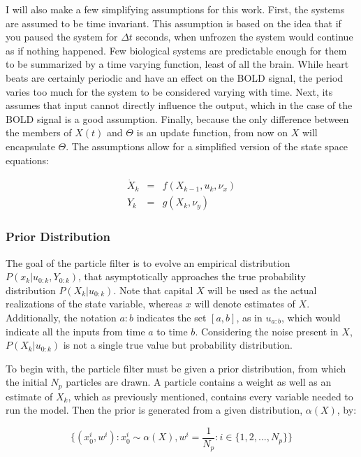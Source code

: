 \documentclass[journal]{./IEEEtran}
\begin{document}
I will also make a few  simplifying assumptions for this work. 
First, the systems are assumed to be 
time invariant. This 
assumption is based on the idea that if you paused the system for $\Delta t$
seconds, when unfrozen the system would continue as if nothing happened. 
Few biological systems are predictable enough for them to be summarized
by a time varying function, least of all the brain. While heart beats are certainly
periodic and have an effect on the BOLD signal, the period varies too much
for the system to be considered varying with time. 
Next, its assumes that input cannot directly
influence the output, which in the case of the BOLD signal is a good assumption.
Finally, because the only difference between the members of $X(t)$ and 
$\Theta$ is an update function, from now on $X$ will encapsulate
$\Theta$. The assumptions allow for a simplified version of the
state space equations:

\begin{eqnarray}
\dot{X}_k &=& f(X_{k-1}, u_k, \nu_x)
\label{eq:stateass}\\
Y_k &= &g(X_k, \nu_y)
\label{eq:measass}
\end{eqnarray}

\subsubsection{Prior Distribution}
The goal of the particle filter is to evolve an empirical distribution 
$P(x_k | u_{0:k}, Y_{0:k})$,
that asymptotically approaches the true probability distribution $P(X_k | u_{0:k})$.
Note that capital $X$ will be used as the actual realizations of 
the state variable, whereas $x$ will denote estimates of $X$.
Additionally, the notation $a:b$ indicates the set $[a,b]$,
as in $u_{a:b}$, which would indicate all the inputs from time $a$ to time $b$.
Considering the noise present in $X$,
 $P(X_k | u_{0:k})$ is not a single true value but probability distribution. 

To begin with, the particle filter must be given a prior distribution, from
which the initial $N_p$ particles are drawn. A particle contains a weight
as well as an estimate of $X_k$, which as previously mentioned, contains every
variable needed to run the model. Then the prior is generated from a 
given distribution, $\alpha(X)$, by:

\begin{equation}
\{(x^i_0,w^i) : x^i_0 \sim \alpha(X), w^i = 
            \frac{1}{N_p} : i \in \{1, 2, ... , N_p\} \}
\end{equation}
\end{document}
